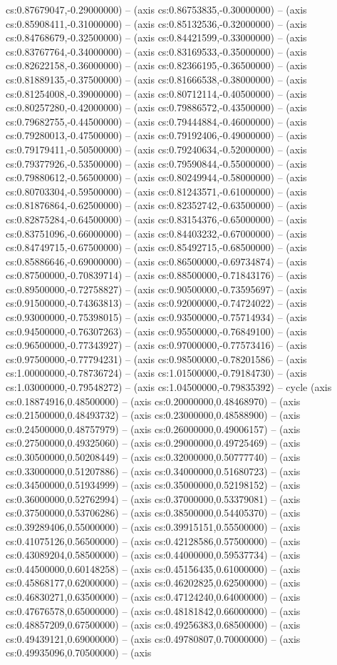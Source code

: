 cs:0.87679047,-0.29000000) -- (axis cs:0.86753835,-0.30000000) -- (axis cs:0.85908411,-0.31000000) -- (axis cs:0.85132536,-0.32000000) -- (axis cs:0.84768679,-0.32500000) -- (axis cs:0.84421599,-0.33000000) -- (axis cs:0.83767764,-0.34000000) -- (axis cs:0.83169533,-0.35000000) -- (axis cs:0.82622158,-0.36000000) -- (axis cs:0.82366195,-0.36500000) -- (axis cs:0.81889135,-0.37500000) -- (axis cs:0.81666538,-0.38000000) -- (axis cs:0.81254008,-0.39000000) -- (axis cs:0.80712114,-0.40500000) -- (axis cs:0.80257280,-0.42000000) -- (axis cs:0.79886572,-0.43500000) -- (axis cs:0.79682755,-0.44500000) -- (axis cs:0.79444884,-0.46000000) -- (axis cs:0.79280013,-0.47500000) -- (axis cs:0.79192406,-0.49000000) -- (axis cs:0.79179411,-0.50500000) -- (axis cs:0.79240634,-0.52000000) -- (axis cs:0.79377926,-0.53500000) -- (axis cs:0.79590844,-0.55000000) -- (axis cs:0.79880612,-0.56500000) -- (axis cs:0.80249944,-0.58000000) -- (axis cs:0.80703304,-0.59500000) -- (axis cs:0.81243571,-0.61000000) -- (axis cs:0.81876864,-0.62500000) -- (axis cs:0.82352742,-0.63500000) -- (axis cs:0.82875284,-0.64500000) -- (axis cs:0.83154376,-0.65000000) -- (axis cs:0.83751096,-0.66000000) -- (axis cs:0.84403232,-0.67000000) -- (axis cs:0.84749715,-0.67500000) -- (axis cs:0.85492715,-0.68500000) -- (axis cs:0.85886646,-0.69000000) -- (axis cs:0.86500000,-0.69734874) -- (axis cs:0.87500000,-0.70839714) -- (axis cs:0.88500000,-0.71843176) -- (axis cs:0.89500000,-0.72758827) -- (axis cs:0.90500000,-0.73595697) -- (axis cs:0.91500000,-0.74363813) -- (axis cs:0.92000000,-0.74724022) -- (axis cs:0.93000000,-0.75398015) -- (axis cs:0.93500000,-0.75714934) -- (axis cs:0.94500000,-0.76307263) -- (axis cs:0.95500000,-0.76849100) -- (axis cs:0.96500000,-0.77343927) -- (axis cs:0.97000000,-0.77573416) -- (axis cs:0.97500000,-0.77794231) -- (axis cs:0.98500000,-0.78201586) -- (axis cs:1.00000000,-0.78736724) -- (axis cs:1.01500000,-0.79184730) -- (axis cs:1.03000000,-0.79548272) -- (axis cs:1.04500000,-0.79835392) -- cycle (axis cs:0.18874916,0.48500000) -- (axis cs:0.20000000,0.48468970) -- (axis cs:0.21500000,0.48493732) -- (axis cs:0.23000000,0.48588900) -- (axis cs:0.24500000,0.48757979) -- (axis cs:0.26000000,0.49006157) -- (axis cs:0.27500000,0.49325060) -- (axis cs:0.29000000,0.49725469) -- (axis cs:0.30500000,0.50208449) -- (axis cs:0.32000000,0.50777740) -- (axis cs:0.33000000,0.51207886) -- (axis cs:0.34000000,0.51680723) -- (axis cs:0.34500000,0.51934999) -- (axis cs:0.35000000,0.52198152) -- (axis cs:0.36000000,0.52762994) -- (axis cs:0.37000000,0.53379081) -- (axis cs:0.37500000,0.53706286) -- (axis cs:0.38500000,0.54405370) -- (axis cs:0.39289406,0.55000000) -- (axis cs:0.39915151,0.55500000) -- (axis cs:0.41075126,0.56500000) -- (axis cs:0.42128586,0.57500000) -- (axis cs:0.43089204,0.58500000) -- (axis cs:0.44000000,0.59537734) -- (axis cs:0.44500000,0.60148258) -- (axis cs:0.45156435,0.61000000) -- (axis cs:0.45868177,0.62000000) -- (axis cs:0.46202825,0.62500000) -- (axis cs:0.46830271,0.63500000) -- (axis cs:0.47124240,0.64000000) -- (axis cs:0.47676578,0.65000000) -- (axis cs:0.48181842,0.66000000) -- (axis cs:0.48857209,0.67500000) -- (axis cs:0.49256383,0.68500000) -- (axis cs:0.49439121,0.69000000) -- (axis cs:0.49780807,0.70000000) -- (axis cs:0.49935096,0.70500000) -- (axis 